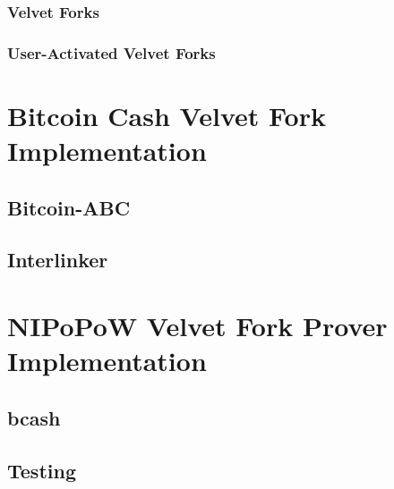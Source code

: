 \documentclass[11pt]{llncs}
\begin{document}
\subsubsection{Velvet Forks}
\subsubsection{User-Activated Velvet Forks}

\section{Bitcoin Cash Velvet Fork Implementation}

\subsection{Bitcoin-ABC}
\subsection{Interlinker}

\section{NIPoPoW Velvet Fork Prover Implementation}

\subsection{bcash}
\subsection{Testing}


\end{document}
